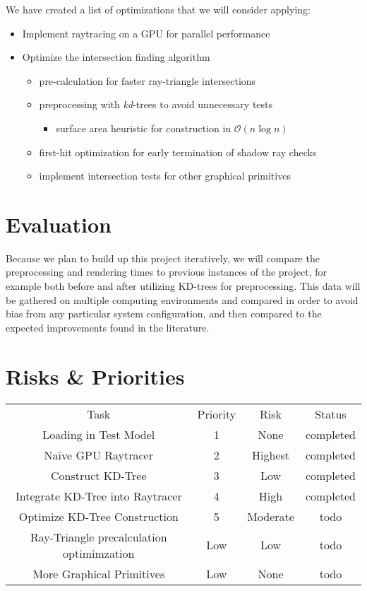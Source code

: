 \documentclass{article}
\begin{document}
We have created a list of optimizations that we will consider applying:
\begin{itemize}
\item Implement raytracing on a GPU for parallel performance
\item Optimize the intersection finding algorithm
    \begin{itemize}
    \item pre-calculation for faster ray-triangle intersections \cite{ray-triangle}
    \item preprocessing with \emph{kd}-trees to avoid unnecessary tests\cite{kd-nlogn}\cite{kd-bvh}
    \begin{itemize}
        \item surface area heuristic for construction in $\mathcal{O}(n\log n)$
    \end{itemize}
    \item first-hit optimization for early termination of shadow ray checks
    \item implement intersection tests for other graphical primitives
    \end{itemize}
\end{itemize}

\section*{Evaluation}
Because we plan to build up this project iteratively, we will compare the preprocessing and rendering times to previous instances of the project, for example both before and after utilizing KD-trees for preprocessing. This data will be gathered on multiple computing environments and compared in order to avoid bias from any particular system configuration, and then compared to the expected improvements found in the literature.

\section*{Risks \& Priorities}
\begin{center}\begin{tabu}{|c|c|c|c|}\everyrow{\hline}\hline
Task&Priority&Risk&Status\\
Loading in Test Model&1&None&\color{blue}completed\\
Naïve GPU Raytracer&2&Highest&\color{blue}completed\\
Construct KD-Tree&3&Low&\color{blue}completed\\
Integrate KD-Tree into Raytracer&4&High&\color{blue}completed\\
Optimize KD-Tree Construction&5&Moderate&\color{red}todo\\
Ray-Triangle precalculation optimimzation&Low&Low&\color{red}todo\\
More Graphical Primitives&Low&None&\color{red}todo\\
\end{tabu}\end{center}
\end{document}
